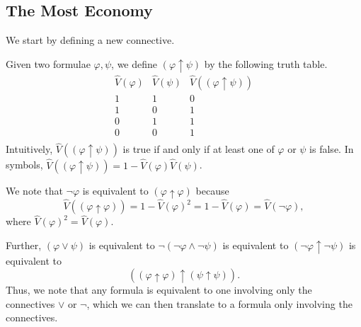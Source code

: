 \documentclass[../notes.tex]{subfiles}
\begin{document}
\subsection{The Most Economy}
We start by defining a new connective.
\begin{definition}
	Given two formulae $\varphi,\psi$, we define $(\varphi\uparrow\psi)$ by the following truth table.
	\[\begin{array}{c|c||c}
		\hat V(\varphi) & \hat V(\psi) & \hat V((\varphi\uparrow\psi)) \\
		\hline
		1 & 1 & 0 \\
		1 & 0 & 1 \\
		0 & 1 & 1 \\
		0 & 0 & 1 \\
	\end{array}\]
	Intuitively, $\hat V((\varphi\uparrow\psi))$ is true if and only if at least one of $\varphi$ or $\psi$ is false. In symbols, $\hat V((\varphi\uparrow\psi))=1-\hat V(\varphi)\hat V(\psi)$.
\end{definition}
We note that $\lnot\varphi$ is equivalent to $(\varphi\uparrow\varphi)$ because
\[\hat V((\varphi\uparrow\varphi))=1-\hat V(\varphi)^2=1-\hat V(\varphi)=\hat V(\lnot\varphi),\]
where $\hat V(\varphi)^2=\hat V(\varphi)$.

Further, $(\varphi\lor\psi)$ is equivalent to $\lnot(\lnot\varphi\land\lnot\psi)$ is equivalent to $(\lnot\varphi\uparrow\lnot\psi)$ is equivalent to
\[((\varphi\uparrow\varphi)\uparrow(\psi\uparrow\psi)).\]
Thus, we note that any formula is equivalent to one involving only the connectives $\lor$ or $\lnot$, which we can then translate to a formula only involving the connectives.
\end{document}
